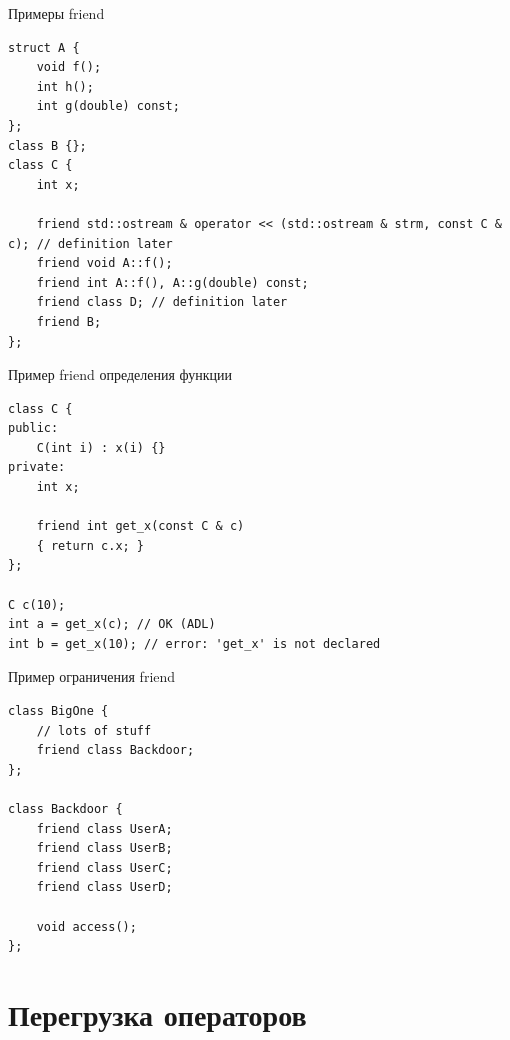 \documentclass[unknownkeysallowed,xcolor=table]{beamer}
\begin{document}
\begin{frame}[fragile]{Примеры friend}
\begin{lstlisting}
struct A {
    void f();
    int h();
    int g(double) const;
};
class B {};
class C {
    int x;
    
    friend std::ostream & operator << (std::ostream & strm, const C & c); // definition later
    friend void A::f();
    friend int A::f(), A::g(double) const;
    friend class D; // definition later
    friend B;
};
\end{lstlisting}
\end{frame}

\begin{frame}[fragile]{Пример friend определения функции}
\begin{lstlisting}
class C {
public:
    C(int i) : x(i) {}
private:
    int x;
    
    friend int get_x(const C & c)
    { return c.x; }
};

C c(10);
int a = get_x(c); // OK (ADL)
int b = get_x(10); // error: 'get_x' is not declared
\end{lstlisting}
\end{frame}

\begin{frame}[fragile]{Пример ограничения friend}
\begin{lstlisting}
class BigOne {
    // lots of stuff
    friend class Backdoor;
};

class Backdoor {
    friend class UserA;
    friend class UserB;
    friend class UserC;
    friend class UserD;
    
    void access();
};
\end{lstlisting}
\end{frame}



\section{Перегрузка операторов}
\end{document}
